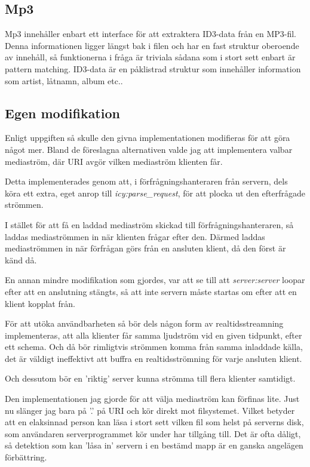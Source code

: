 \documentclass[a4paper, 11pt]{article}
\begin{document}
\subsection{Mp3}

Mp3 innehåller enbart ett interface för att extraktera ID3-data från en MP3-fil. Denna informationen ligger längst bak i filen och har en fast struktur oberoende av innehåll, så funktionerna i fråga är triviala sådana som i stort sett enbart är pattern matching. ID3-data är en påklistrad struktur som innehåller information som artist, låtnamn, album etc..

\subsection{Egen modifikation}

Enligt uppgiften så skulle den givna implementationen modifieras för att göra något mer. Bland de föreslagna alternativen valde jag att implementera valbar mediaström, där URI avgör vilken mediaström klienten får.

Detta implementerades genom att, i förfrågningshanteraren från servern, dels köra ett extra, eget anrop till \emph{icy:parse\_request}, för att plocka ut den efterfrågade strömmen.

I stället för att få en laddad mediaström skickad till förfrågningshanteraren, så laddas mediaströmmen in när klienten frågar efter den. Därmed laddas mediaströmmen in när förfrågan görs från en ansluten klient, då den först är känd då.

En annan mindre modifikation som gjordes, var att se till att \emph{server:server} loopar efter att en anslutning stängts, så att inte servern måste startas om
efter att en klient kopplat från.

För att utöka användbarheten så bör dels någon form av realtidsstreamning implementeras, att alla klienter får samma ljudström vid en given tidpunkt, efter ett schema.
Och då bör rimligtvis strömmen komma från samma inladdade källa, det är väldigt ineffektivt att buffra en realtidsströmning för varje ansluten klient.

Och dessutom bör en 'riktig' server kunna strömma till flera klienter samtidigt. 

Den implementationen jag gjorde för att välja mediaström kan förfinas lite. Just nu slänger jag bara på '.' på URI och kör direkt mot filsystemet. Vilket betyder att en elaksinnad person kan läsa i stort sett vilken fil som helst på serverns disk, som användaren serverprogrammet kör under har tillgång till. Det är ofta dåligt,
så detektion som kan 'låsa in' servern i en bestämd mapp är en ganska angelägen förbättring.
\end{document}
